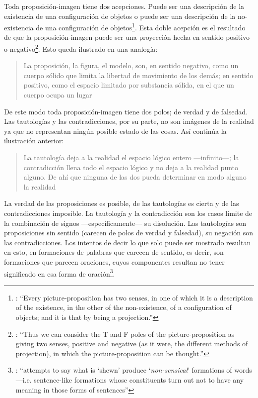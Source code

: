 Toda proposición-imagen tiene dos acepciones. Puede ser una descripción de la existencia de una configuración de objetos o puede ser una descripción de la no-existencia de una configuración de objetos\footnote{\cite[Cf.~][72]{anscombe1959iwt}: \enquote{Every picture-proposition has two senses, in one of which it is a description of the existence, in the other of the non-existence, of a configuration of objects; and it is that by being a projection.}}. Esta doble acepción es el resultado de que la proposición-imagen puede ser una proyección hecha en sentido positivo o negativo\footnote{\cite[Cf.~][74]{anscombe1959iwt}: \enquote{Thus we can consider the T and F poles of the picture-proposition as giving two senses, positive and negative (as it were, the different methods of projection), in which the picture-proposition can be thought.}}. Esto queda ilustrado en una analogía: \blockquote[{\cite[\S4.463]{wittgenstein1922tractatuses}}]{La proposición, la figura, el modelo, son, en sentido negativo, como un cuerpo sólido que limita la libertad de movimiento de los demás; en sentido positivo, como el espacio limitado por substancia sólida, en el que un cuerpo ocupa un lugar}.

De este modo toda proposición-imagen tiene dos polos; de verdad y de falsedad. Las tautologías y las contradicciones, por su parte, no son imágenes de la realidad ya que no representan ningún posible estado de las cosas. Así continúa la ilustración anterior:
\blockquote[{\cite[\S4.463]{wittgenstein1922tractatuses}}]{La tautología deja a la realidad el espacio lógico entero ---infinito---; la contradicción llena todo el espacio lógico y no deja a la realidad punto alguno. De ahí que ninguna de las dos pueda determinar en modo alguno la realidad}.

La verdad de las proposiciones es posible, de las tautologías es cierta y de las contradicciones imposible. La tautología y la contradicción son los casos límite de la combinación de signos ---específicamente--- su disolución\autocite[Cf.~][\S4.464 y \S4.466]{wittgenstein1922tractatuses}. Las tautologías son proposiciones sin sentido (carecen de polos de verdad y falsedad), su negación son las contradicciones. Los intentos de decir lo que solo puede ser mostrado resultan en esto, en formaciones de palabras que carecen de sentido, es decir, son formaciones que parecen oraciones, cuyos componentes resultan no tener significado en esa forma de oración\footnote{\cite[Cf.~][163]{anscombe1959iwt}: \enquote{attempts to say what is `shewn' produce `\emph{non-sensical}' formations of words---i.e. sentence-like formations whose constituents turn out not to have any meaning in those forms of sentences}}.

